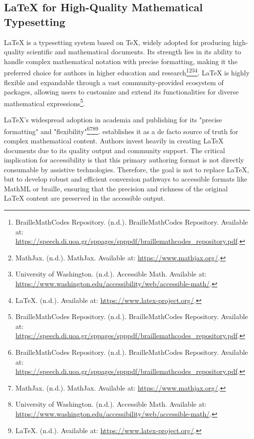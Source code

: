 \subsection{LaTeX for High-Quality Mathematical Typesetting}
LaTeX is a typesetting system based on TeX, widely adopted for producing high-quality scientific and mathematical documents. Its strength lies in its ability to handle complex mathematical notation with precise formatting, making it the preferred choice for authors in higher education and research\footnote{BrailleMathCodes Repository. (n.d.). BrailleMathCodes Repository. Available at: \url{https://speech.di.uoa.gr/sppages/spppdf/braillemathcodes_repository.pdf}.}\footnote{MathJax. (n.d.). MathJax. Available at: \url{https://www.mathjax.org/}.}\footnote{University of Washington. (n.d.). Accessible Math. Available at: \url{https://www.washington.edu/accessibility/web/accessible-math/}.}\footnote{LaTeX. (n.d.). Available at: \url{https://www.latex-project.org/}.}. LaTeX is highly flexible and expandable through a vast community-provided ecosystem of packages, allowing users to customize and extend its functionalities for diverse mathematical expressions\footnote{BrailleMathCodes Repository. (n.d.). BrailleMathCodes Repository. Available at: \url{https://speech.di.uoa.gr/sppages/spppdf/braillemathcodes_repository.pdf}.}.

LaTeX's widespread adoption in academia and publishing for its "precise formatting" and "flexibility"\footnote{BrailleMathCodes Repository. (n.d.). BrailleMathCodes Repository. Available at: \url{https://speech.di.uoa.gr/sppages/spppdf/braillemathcodes_repository.pdf}.}\footnote{MathJax. (n.d.). MathJax. Available at: \url{https://www.mathjax.org/}.}\footnote{University of Washington. (n.d.). Accessible Math. Available at: \url{https://www.washington.edu/accessibility/web/accessible-math/}.}\footnote{LaTeX. (n.d.). Available at: \url{https://www.latex-project.org/}.}. establishes it as a de facto source of truth for complex mathematical content. Authors invest heavily in creating LaTeX documents due to its quality output and community support. The critical implication for accessibility is that this primary authoring format is not directly consumable by assistive technologies. Therefore, the goal is not to replace LaTeX, but to develop robust and efficient conversion pathways to accessible formats like MathML or braille, ensuring that the precision and richness of the original LaTeX content are preserved in the accessible output.

